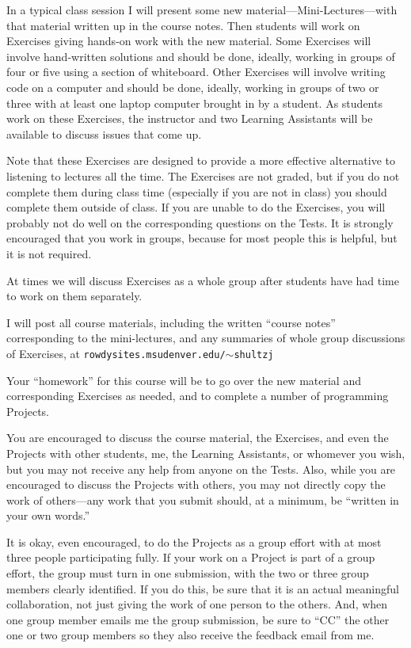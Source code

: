 In a typical class session I will present some new material---Mini-Lectures---with that material written up 
 in the
course notes.  Then students will work on Exercises giving hands-on work with the new material.
Some Exercises will involve hand-written solutions and should be done, ideally, working in groups of
four or five using a section of whiteboard.  Other Exercises will involve writing code on a computer and
should be done, ideally, working in groups of two or three with at least one laptop computer brought in
by a student.
As students work on these Exercises, the instructor and two Learning Assistants will be available to
discuss issues that come up.
\medskip

Note that these Exercises are designed to provide a more effective alternative to listening to lectures all
the time.  The Exercises are not graded, but if you do not complete them during class time (especially if
you are not in class) you should complete them outside of class.  If you are unable to do the Exercises,
you will probably not do well on the corresponding questions on the Tests.
It is strongly encouraged that you work in groups, because for most people this is helpful, but it is not
required.
\medskip

At times we will discuss Exercises as a whole group after students have had time to work on them separately.
\medskip

I will post all course materials, including the written ``course notes'' corresponding to the 
mini-lectures, and any summaries of whole group discussions of Exercises,
at\hfil\break
{\tt rowdysites.msudenver.edu/$\sim$shultzj}
\bigskip

Your ``homework'' for this course will be to go over the new material and corresponding Exercises as needed,
and to complete a number of programming Projects.
\medskip

You are encouraged to discuss the course
material, the Exercises, and even the Projects
with other students, me, the Learning Assistants, or whomever you wish, 
but you may not receive any help from anyone on the Tests.
Also, while you are encouraged to discuss the Projects
with others, you may not directly copy the work of
others---any work that you submit should, at a minimum,
be ``written in your own words.''
\medskip

It is okay, even encouraged, to do the Projects as a group effort with at most three people participating fully.
If your work on a Project is part of a group effort, the group must turn in one submission,
with the two or three group members clearly identified.  If you do this, be sure that it is an
actual meaningful collaboration, not just giving the work of one person to the others.  And,
when one group member emails me the group submission, be sure to ``CC'' the other
one or two group members so they also receive the feedback email from me.
\medskip

